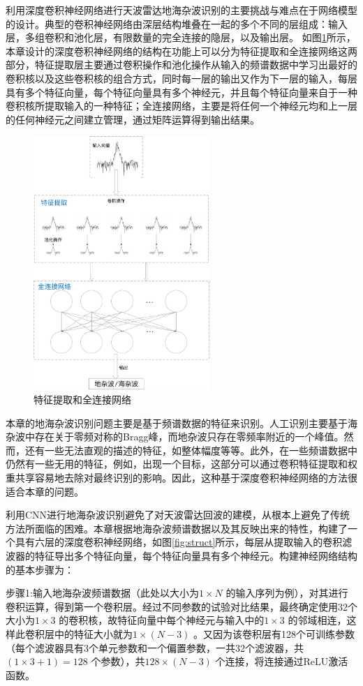 利用深度卷积神经网络进行天波雷达地海杂波识别的主要挑战与难点在于网络模型的设计。典型的卷积神经网络由深层结构堆叠在一起的多个不同的层组成：输入层，多组卷积和池化层，有限数量的完全连接的隐层，以及输出层。
如图\ref{fig:fullconnect}所示，本章设计的深度卷积神经网络的结构在功能上可以分为特征提取和全连接网络这两部分，特征提取层主要通过卷积操作和池化操作从输入的频谱数据中学习出最好的卷积核以及这些卷积核的组合方式，同时每一层的输出又作为下一层的输入，每层具有多个特征向量，每个特征向量具有多个神经元，并且每个特征向量来自于一种卷积核所提取输入的一种特征；全连接网络，主要是将任何一个神经元均和上一层的任何神经元之间建立管理，通过矩阵运算得到输出结果。
\begin{figure}[hbt]
	\centering
	\includegraphics[width=6.67cm]{figures/othr/fullconnect}
	\caption{特征提取和全连接网络}
	\label{fig:fullconnect}
\end{figure}

本章的地海杂波识别问题主要是基于频谱数据的特征来识别。人工识别主要基于海杂波中存在关于零频对称的Bragg峰，而地杂波只存在零频率附近的一个峰值。然而，还有一些无法直观的描述的特征，如整体幅度等等。此外，在一些频谱数据中仍然有一些无用的特征，例如，出现一个目标，这部分可以通过卷积特征提取和权重共享容易地去除对最终识别的影响。因此，这种基于深度卷积神经网络的方法很适合本章的问题。

利用CNN进行地海杂波识别避免了对天波雷达回波的建模，从根本上避免了传统方法所面临的困难。本章根据地海杂波频谱数据以及其反映出来的特性，构建了一个具有六层的深度卷积神经网络，如图\ref{fig:struct}所示，每层从提取输入的卷积滤波器的特征导出多个特征向量，每个特征向量具有多个神经元。构建神经网络结构的基本步骤为：

步骤1:输入地海杂波频谱数据（此处以大小为$1\times N$ 的输入序列为例），对其进行卷积运算，得到第一个卷积层。经过不同参数的试验对比结果，最终确定使用32个大小为$1\times 3$ 的卷积核，故特征向量中每个神经元与输入中的$1\times 3$ 的邻域相连，这样此卷积层中的特征大小就为$1\times (N-3)$ 。又因为该卷积层有128个可训练参数（每个滤波器具有3个单元参数和一个偏置参数，一共32个滤波器，共$(1\times 3 + 1) = 128$ 个参数），共$128\times(N-3)$ 个连接，将连接通过ReLU激活函数。

